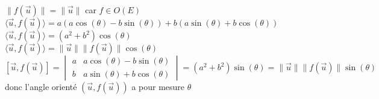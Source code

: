 \documentclass{article}
\begin{document}
$\| f(\vec u) \|= \| \vec u \|$ car $f \in O(E)$ \\
$\langle \vec u,f(\vec u) \rangle= a(a\cos(\theta)-b\sin(\theta))+ b(a\sin(\theta)+b\cos(\theta))$ \\
$\langle \vec u,f(\vec u) \rangle= (a^2 +b^2) \cos(\theta)$ \\
$\langle \vec u,f(\vec u) \rangle= \|\vec u \| \| f(\vec u) \| \cos(\theta)$ \\
$[\vec u, f(\vec u)]= \begin{vmatrix}
a & a\cos(\theta)-b\sin(\theta) \\
b & a\sin(\theta)+ b \cos(\theta)
\end{vmatrix}=(a^2+b^2)\sin(\theta)= \|\vec u \| \| f(\vec u) \| \sin(\theta)$ \\
donc l'angle orienté $(\vec u, f(\vec u))$ a pour mesure $\theta$
\end{document}
